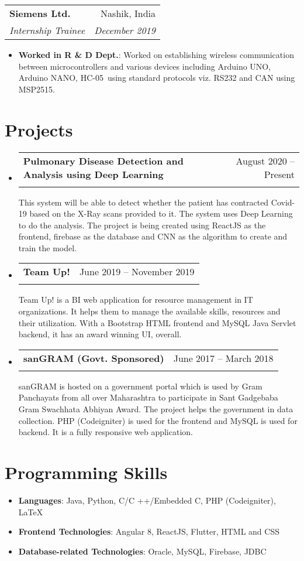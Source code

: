\documentclass[a4,11pt]{article}
\makeatletter
\newcommand{\resumeItem}[2]{
  \item\small{
    \textbf{#1}{: #2 \vspace{-2pt}}
  }
}
\newcommand{\resumeCompany}[4]{
    \begin{tabular*}{0.99\textwidth}[t]{l@{\extracolsep{\fill}}r}
      \textbf{#1} & #2 \\
      \textit{\small#3} & \textit{\small #4} \\
    \end{tabular*}\vspace{-5pt}
}
\newcommand{\resumeSubheading}[4]{
  \vspace{-1pt}\item
    \begin{tabular*}{0.97\textwidth}[t]{l@{\extracolsep{\fill}}r}
      \textbf{#1} & #2 \\
      \textit{\small#3} & \textit{\small #4} \\
    \end{tabular*}\vspace{-5pt}
}
\newcommand{\resumeSubSubheading}[2]{
    \begin{tabular*}{0.97\textwidth}{l@{\extracolsep{\fill}}r}
      \textit{\small#1} & \textit{\small #2} \\
    \end{tabular*}\vspace{-5pt}
}
\newcommand{\resumeSubHeadingListStart}{\begin{itemize}[leftmargin=*]}
\newcommand{\resumeSubHeadingListEnd}{\end{itemize}}
\newcommand{\resumeItemListStart}{\begin{itemize}}
\newcommand{\resumeItemListEnd}{\end{itemize}\vspace{-5pt}}
\makeatother
\begin{document}
	\resumeCompany
		{Siemens Ltd.}{Nashik, India}
		{Internship Trainee}{December 2019}
			\resumeItemListStart
				\resumeItem{Worked in R \& D Dept.}{Worked on establishing wireless communication between microcontrollers and various devices including Arduino UNO, Arduino NANO, HC-05 using standard protocols viz. RS232 and CAN using MSP2515.}
      		\resumeItemListEnd


\section{Projects}
  \resumeSubHeadingListStart
  		\resumeSubheading
  		{Pulmonary Disease Detection and Analysis using Deep Learning}{August 2020 -- Present}
  		{}{}
  		{This system will be able to detect whether the patient has contracted Covid-19 based on the X-Ray scans provided to it. The system uses Deep Learning to do the analysis. The project is being created using ReactJS as the frontend, firebase as the database and CNN as the algorithm to create and train the model.}
  		\resumeSubheading
	  	{Team Up!}{June 2019 -- November 2019}
		{}{}
		{Team Up! is a BI web application for resource management in IT organizations. It helps them to manage the available skills, resources and their utilization. With a Bootstrap HTML frontend and MySQL Java Servlet backend, it has an award winning UI, overall.}
		\resumeSubheading
		{sanGRAM (Govt. Sponsored)}{June 2017 -- March 2018}
		{}{}
		{sanGRAM is hosted on a government portal which is used by Gram Panchayats from all over Maharashtra to participate in Sant Gadgebaba Gram Swachhata Abhiyan Award. The project helps the government in data collection. PHP (Codeigniter) is used for the frontend and MySQL is used for backend. It is a fully responsive web application.}
  \resumeSubHeadingListEnd
\section{Programming Skills}
	\resumeSubHeadingListStart
		\item{\textbf{Languages}{: Java, Python, C/C ++/Embedded C, PHP (Codeigniter), LaTeX} }
		\hfill
		\item{\textbf{Frontend Technologies}{: Angular 8, ReactJS, Flutter, HTML and CSS} }
		\item{\textbf{Database-related Technologies}{: Oracle, MySQL, Firebase, JDBC} }
		\hfill
	\resumeSubHeadingListEnd
\end{document}

